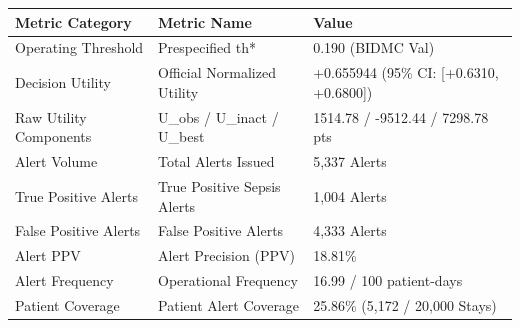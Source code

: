 \begin{tabular}{lll}
\toprule
Metric Category & Metric Name & Value \\
\midrule
Operating Threshold & Prespecified th* & 0.190 (BIDMC Val) \\
Decision Utility & Official Normalized Utility & +0.655944 (95\% CI: [+0.6310, +0.6800]) \\
Raw Utility Components & U_obs / U_inact / U_best & 1514.78 / -9512.44 / 7298.78 pts \\
Alert Volume & Total Alerts Issued & 5,337 Alerts \\
True Positive Alerts & True Positive Sepsis Alerts & 1,004 Alerts \\
False Positive Alerts & False Positive Alerts & 4,333 Alerts \\
Alert PPV & Alert Precision (PPV) & 18.81\% \\
Alert Frequency & Operational Frequency & 16.99 / 100 patient-days \\
Patient Coverage & Patient Alert Coverage & 25.86\% (5,172 / 20,000 Stays) \\
\bottomrule
\end{tabular}
